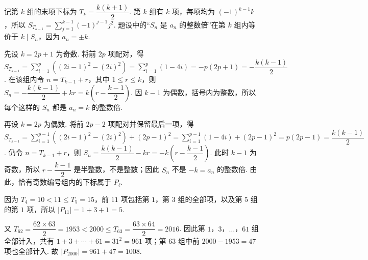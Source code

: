 \begin{solution}
记第 \(k\) 组的末项下标为 \(T_k=\dfrac{k(k+1)}2\). 第 \(k\) 组有 \(k\) 项，每项均为 \((-1)^{k-1}k\)，所以
\(S_{T_{k-1}}=\sum_{j=1}^{k-1}(-1)^{j-1}j^2\). 题设中的“\(S_n\) 是 \(a_n\) 的整数倍”在第 \(k\) 组内等价于 \(k\mid S_n\)，因为 \(a_n=\pm k\).

先设 \(k=2p+1\) 为奇数. 将前 \(2p\) 项配对，得
\(S_{T_{k-1}}=\sum_{i=1}^{p}\left((2i-1)^2-(2i)^2\right)=\sum_{i=1}^{p}(1-4i)=-p(2p+1)=-\dfrac{k(k-1)}2\). 在该组内令 \(n=T_{k-1}+r\)，其中 \(1\leqslant r\leqslant k\)，则
\(S_n=-\dfrac{k(k-1)}2+kr=k\left(r-\dfrac{k-1}{2}\right)\). 因 \(k-1\) 为偶数，括号内为整数，所以每个这样的 \(S_n\) 都是 \(a_n=k\) 的整数倍.

再设 \(k=2p\) 为偶数. 将前 \(2p-2\) 项配对并保留最后一项，得
\(S_{T_{k-1}}=\sum_{i=1}^{p-1}\left((2i-1)^2-(2i)^2\right)+(2p-1)^2=\sum_{i=1}^{p-1}(1-4i)+(2p-1)^2=p(2p-1)=\dfrac{k(k-1)}2\). 仍令 \(n=T_{k-1}+r\)，则
\(S_n=\dfrac{k(k-1)}2-kr=-k\left(r-\dfrac{k-1}{2}\right)\). 此时 \(k-1\) 为奇数，所以 \(r-\dfrac{k-1}{2}\) 是半整数，不是整数；因此 \(S_n\) 不是 \(-k=a_n\) 的整数倍. 由此，恰有奇数编号组内的下标属于 \(P_\ell\).

因为 \(T_4=10<11\leqslant T_5=15\)，前 \(11\) 项包括第 \(1\)，第 \(3\) 组的全部项，以及第 \(5\) 组的第 \(1\) 项，所以
\(|P_{11}|=1+3+1=5\).

又 \(T_{62}=\dfrac{62\times63}{2}=1953<2000\leqslant T_{63}=\dfrac{63\times64}{2}=2016\). 因此第 \(1\)，\(3\)，\(\ldots\)，\(61\) 组全部计入，共有
\(1+3+\cdots+61=31^2=961\) 项；第 \(63\) 组中前 \(2000-1953=47\) 项也全部计入. 故
\(|P_{2000}|=961+47=1008\).
\end{solution}
